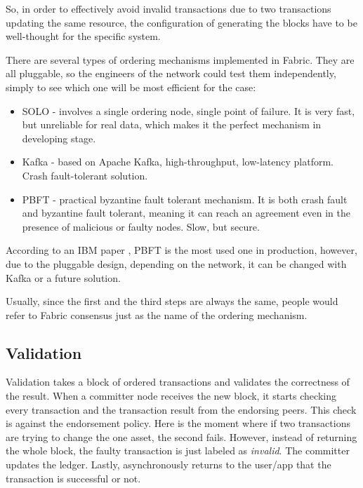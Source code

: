 \documentclass[a4paper,11pt]{report}
\begin{document}
	So, in order to effectively avoid invalid transactions due to two transactions updating the same resource, the configuration of generating the blocks have to be well-thought for the specific system. 
	
There are several types of ordering mechanisms implemented in Fabric. They are all pluggable, so the engineers of the network could test them independently, simply to see which one will be most efficient for the case: 
\begin{itemize}
\item SOLO - involves a single ordering node, single point of failure. It is very fast, but unreliable for real data, which makes it the perfect mechanism in developing stage. 
\item Kafka - based on Apache Kafka, high-throughput, low-latency platform. Crash fault-tolerant solution. 
\item PBFT - practical byzantine fault tolerant mechanism. It is both crash fault and byzantine fault tolerant, meaning it can reach an agreement even in the presence of malicious or faulty nodes. Slow, but secure.
\end{itemize}
According to an IBM paper \cite{cachin2016architecture}, PBFT is the most used one in production, however, due to the pluggable design, depending on the network, it can be changed with Kafka or a future solution.

Usually, since the first and the third steps are always the same, people would refer to Fabric consensus just as the name of the ordering mechanism.

\subsection{Validation}

Validation takes a block of ordered transactions and validates the correctness of the result. 
When a committer node receives the new block, it starts checking every transaction and the transaction result from the endorsing peers. This check is against the endorsement policy. Here is the moment where if two transactions are trying to change the one asset, the second fails. However, instead of returning the whole block, the faulty transaction is just labeled as \textit{invalid}. The committer updates the ledger. Lastly, asynchronously returns to the user/app that the transaction is successful or not. 
\end{document}
